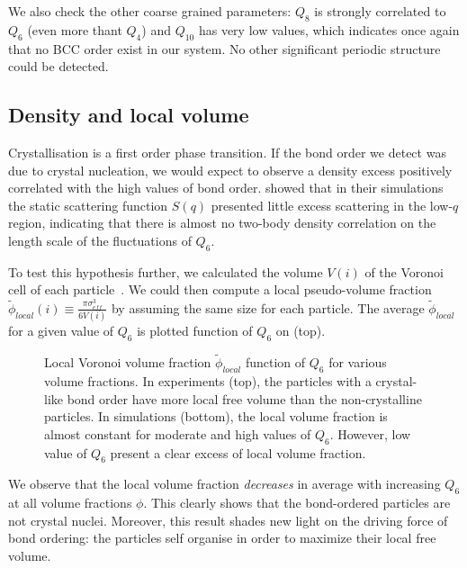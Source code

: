 We also check the other coarse grained parameters: $Q_8$ is strongly correlated to $Q_6$ (even more thant $Q_4$) and $Q_{10}$ has very low values, which indicates once again that no \ac{BCC} order exist in our system. No other significant periodic structure could be detected.

\subsection{Density and local volume}
\label{sec:density_X}

Crystallisation is a first order phase transition. If the bond order we detect was due to crystal nucleation, we would expect to observe a density excess positively correlated with the high values of bond order. \citet{tanaka2010critical} showed that in their simulations the static scattering function $S(q)$ presented little excess scattering in the low-$q$ region, indicating that there is almost no two-body density correlation on the length scale of the fluctuations of $Q_6$. 

To test this hypothesis further, we calculated the volume $V(i)$ of the Voronoi cell of each particle~\citep{Rycroft2006, rycroft2007multiscale}. We could then compute a local pseudo-volume fraction $\tilde{\phi}_{local}(i) \equiv \frac{\pi\sigma_{eff}^3}{6 V(i)}$ by assuming the same size for each particle. The average $\tilde{\phi}_{local}$ for a given value of $Q_6$ is plotted function of $Q_6$ on  (top).

\begin{figure}
	\centering
	\resizebox{\textwidth}{!}{}
	\caption{Local Voronoi volume fraction $\tilde{\phi}_{local}$ function of $Q_6$ for various volume fractions. In experiments (top), the particles with a crystal-like bond order have more local free volume than the non-crystalline particles. In simulations (bottom), the local volume fraction is almost constant for moderate and high values of $Q_6$. However, low value of $Q_6$ present a clear excess of local volume fraction.}
	\label{fig:vol_Q6}
\end{figure}

We observe that the local volume fraction \emph{decreases} in average with increasing $Q_6$ at all volume fractions $\phi$. This clearly shows that the bond-ordered particles are not crystal nuclei. Moreover, this result shades new light on the driving force of bond ordering: the particles self organise in order to maximize their local free volume.

